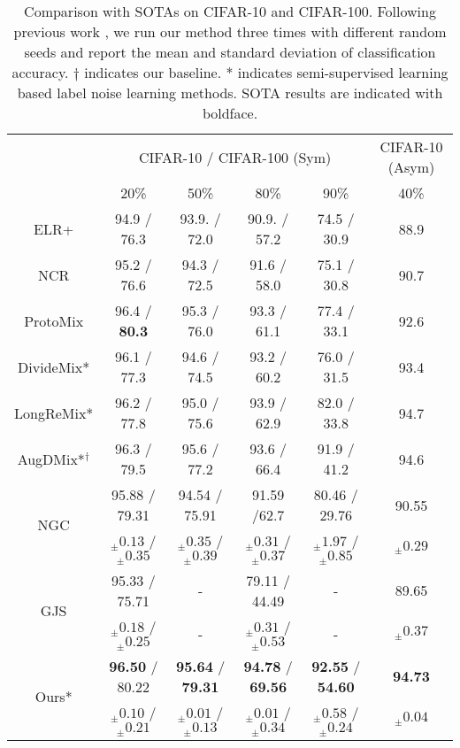 \documentclass{article} \usepackage{iclr2023_conference,times}
\begin{document}
\begin{table}[t]
\vspace{-1\baselineskip}
\caption{Comparison with SOTAs on CIFAR-10 and CIFAR-100. Following previous work \citep{ wu2021ngc}, we run our method three times with different random seeds and report the mean and standard deviation of classification accuracy. $\dagger$ indicates our baseline. * indicates semi-supervised learning based label noise learning methods. SOTA results are indicated with  boldface.}
\label{table-sota-cifar}
\small
\begin{center}
\begin{tabular}{c|cccc|c}
& \multicolumn{4}{c|}{CIFAR-10 / CIFAR-100 (Sym)} & CIFAR-10 (Asym) \\
& 20\% & 50\% & 80\% & 90\% & 40\% \\ \midrule
ELR+ & 94.9  / 76.3  & 93.9. / 72.0 & 90.9. / 57.2 & 74.5  / 30.9 & 88.9 \\
NCR & 95.2  / 76.6 & 94.3 / 72.5 & 91.6  / 58.0 & 75.1  / 30.8 & 90.7 \\
ProtoMix & 96.4  / \textbf{80.3} & 95.3 / 76.0 & 93.3  / 61.1 & 77.4  / 33.1 & 92.6 \\
DivideMix* & 96.1  / 77.3 & 94.6  / 74.5 & 93.2  / 60.2 & 76.0  / 31.5 & 93.4 \\
LongReMix* & 96.2  / 77.8 & 95.0  / 75.6 & 93.9  / 62.9 & 82.0  / 33.8 & 94.7 \\
AugDMix*$^{\textbf{$\dagger$}}$ & 96.3  / 79.5 & 95.6  / 77.2 & 93.6  / 66.4 & 91.9  / 41.2 & 94.6 \\ \midrule
\multirow{2}{*}{NGC} & 95.88 / 79.31 & 94.54 / 75.91 & 91.59 /62.7 & 80.46 / 29.76 & 90.55 \\
  & $_{\pm}0.13$ / $_{\pm}0.35$ & $_{\pm}0.35$ / $_{\pm}0.39$ & $_{\pm}0.31$ / $_{\pm}0.37$ & $_{\pm}1.97$ / $_{\pm}0.85$ & $_{\pm}0.29$  \\
\multirow{2}{*}{GJS} & 95.33 / 75.71 & - & 79.11 / 44.49 & - & 89.65 \\
 & $_{\pm}0.18$ / $_{\pm}0.25$ & - & $_{\pm}0.31$ / $_{\pm}0.53$ & - & $_{\pm}0.37$ \\
\multirow{2}{*}{Ours*} & \textbf{96.50} / 80.22 & \textbf{95.64} / \textbf{79.31} & \textbf{94.78} / \textbf{69.56} & \textbf{92.55} / \textbf{54.60} & \multicolumn{1}{c}{\textbf{94.73}} \\
 & $_{\pm}0.10$ / $_{\pm}0.21$  & $_{\pm}0.01$ / $_{\pm}0.13$   & $_{\pm}0.01$ / $_{\pm}0.34$ & $_{\pm}0.58$ / $_{\pm}0.24$ & $_{\pm}0.04$ \end{tabular}
\vspace{-2\baselineskip}
\end{center}
\end{table}
\end{document}
